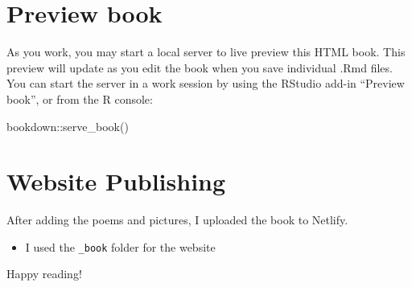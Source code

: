 \documentclass[
]{book}
\newenvironment{Shaded}{\begin{snugshade}}{\end{snugshade}}
\newcommand{\FunctionTok}[1]{\textcolor[rgb]{0.00,0.00,0.00}{#1}}
\newcommand{\NormalTok}[1]{#1}
\newcommand{\SpecialCharTok}[1]{\textcolor[rgb]{0.00,0.00,0.00}{#1}}
\providecommand{\tightlist}{%
  \setlength{\itemsep}{0pt}\setlength{\parskip}{0pt}}
\begin{document}
\hypertarget{preview-book}{%
\section{Preview book}\label{preview-book}}

As you work, you may start a local server to live preview this HTML book. This preview will update as you edit the book when you save individual .Rmd files. You can start the server in a work session by using the RStudio add-in ``Preview book'', or from the R console:

\begin{Shaded}
\begin{Highlighting}[]
\NormalTok{bookdown}\SpecialCharTok{::}\FunctionTok{serve\_book}\NormalTok{()}
\end{Highlighting}
\end{Shaded}

\hypertarget{website-publishing}{%
\section{Website Publishing}\label{website-publishing}}

After adding the poems and pictures, I uploaded the book to Netlify.

\begin{itemize}
\tightlist
\item
  I used the \texttt{\_book} folder for the website
\end{itemize}

Happy reading!

  
\end{document}
